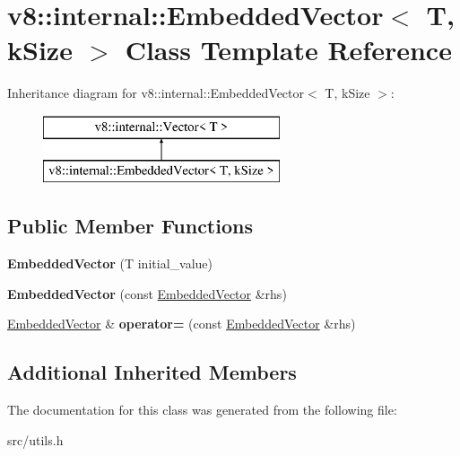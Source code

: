 \hypertarget{classv8_1_1internal_1_1_embedded_vector}{}\section{v8\+:\+:internal\+:\+:Embedded\+Vector$<$ T, k\+Size $>$ Class Template Reference}
\label{classv8_1_1internal_1_1_embedded_vector}
Inheritance diagram for v8\+:\+:internal\+:\+:Embedded\+Vector$<$ T, k\+Size $>$\+:\begin{figure}[H]
\begin{center}
\leavevmode
\includegraphics[height=2.000000cm]{classv8_1_1internal_1_1_embedded_vector}
\end{center}
\end{figure}
\subsection*{Public Member Functions}
\begin{DoxyCompactItemize}
\item 
\hypertarget{classv8_1_1internal_1_1_embedded_vector_a083ff24cfe7d3a2d079045eb8818fbdd}{}{\bfseries Embedded\+Vector} (T initial\+\_\+value)\label{classv8_1_1internal_1_1_embedded_vector_a083ff24cfe7d3a2d079045eb8818fbdd}

\item 
\hypertarget{classv8_1_1internal_1_1_embedded_vector_a4060b1a3ad19ff94e059bc0e7916fc05}{}{\bfseries Embedded\+Vector} (const \hyperlink{classv8_1_1internal_1_1_embedded_vector}{Embedded\+Vector} \&rhs)\label{classv8_1_1internal_1_1_embedded_vector_a4060b1a3ad19ff94e059bc0e7916fc05}

\item 
\hypertarget{classv8_1_1internal_1_1_embedded_vector_a5f6d10806a8caa0f6876ee09ca23f0e7}{}\hyperlink{classv8_1_1internal_1_1_embedded_vector}{Embedded\+Vector} \& {\bfseries operator=} (const \hyperlink{classv8_1_1internal_1_1_embedded_vector}{Embedded\+Vector} \&rhs)\label{classv8_1_1internal_1_1_embedded_vector_a5f6d10806a8caa0f6876ee09ca23f0e7}

\end{DoxyCompactItemize}
\subsection*{Additional Inherited Members}


The documentation for this class was generated from the following file\+:\begin{DoxyCompactItemize}
\item 
src/utils.\+h\end{DoxyCompactItemize}
